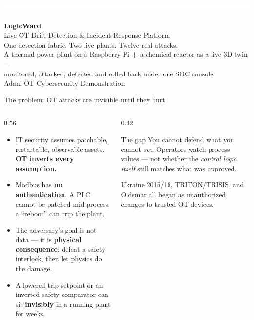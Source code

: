 \documentclass[aspectratio=169,11pt]{beamer}
\newcommand{\hl}[1]{{\color{accent}\textbf{#1}}}
\begin{document}
{
\begin{frame}[plain]
\vspace{0.8cm}
{\color{accent}\rule{0.5\textwidth}{2.5pt}}\\[10pt]
{\Huge\bfseries\color{white} LogicWard}\\[6pt]
{\large\color{page} Live OT Drift-Detection \& Incident-Response Platform}\\[16pt]
{\color{page}\small One detection fabric. Two live plants. Twelve real attacks.}\\[4pt]
{\color{page}\small A thermal power plant on a Raspberry Pi \textbf{+} a chemical reactor as a live 3D twin ---}\\
{\color{page}\small monitored, attacked, detected and rolled back under one SOC console.}\\[22pt]
{\color{muted}\footnotesize Adani OT Cybersecurity Demonstration}
\end{frame}
}

\begin{frame}{The problem: OT attacks are invisible until they hurt}
\begin{columns}[T]
\begin{column}{0.56\textwidth}
\begin{itemize}
  \item IT security assumes patchable, restartable, observable assets. \hl{OT inverts every assumption.}
  \item Modbus has \hl{no authentication}. A PLC cannot be patched mid-process; a ``reboot'' can trip the plant.
  \item The adversary's goal is not data --- it is \hl{physical consequence}: defeat a safety interlock, then let physics do the damage.
  \item A lowered trip setpoint or an inverted safety comparator can sit \hl{invisibly} in a running plant for weeks.
\end{itemize}
\end{column}
\begin{column}{0.42\textwidth}
\begin{block}{The gap}
\small You cannot defend what you cannot \emph{see}. Operators watch process values --- not whether the \emph{control logic itself} still matches what was approved.
\end{block}
\vspace{4pt}
{\color{muted}\footnotesize Ukraine 2015/16, TRITON/TRISIS, and Oldsmar all began as unauthorized changes to trusted OT devices.}
\end{column}
\end{columns}
\end{frame}
\end{document}
